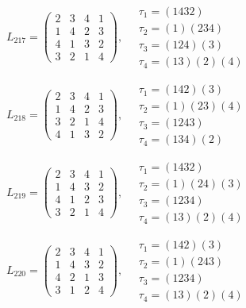 $L_{217} = \begin{pmatrix} 2 & 3 & 4 & 1 \\ 1 & 4 & 2 & 3 \\ 4 & 1 & 3 & 2 \\ 3 & 2 & 1 & 4 \end{pmatrix}, \quad \begin{matrix} \tau_{1} = (1 4 3 2) \\ \tau_{2} = (1)(2 3 4) \\ \tau_{3} = (1 2 4)(3) \\ \tau_{4} = (1 3)(2)(4) \end{matrix}$

$L_{218} = \begin{pmatrix} 2 & 3 & 4 & 1 \\ 1 & 4 & 2 & 3 \\ 3 & 2 & 1 & 4 \\ 4 & 1 & 3 & 2 \end{pmatrix}, \quad \begin{matrix} \tau_{1} = (1 4 2)(3) \\ \tau_{2} = (1)(2 3)(4) \\ \tau_{3} = (1 2 4 3) \\ \tau_{4} = (1 3 4)(2) \end{matrix}$

$L_{219} = \begin{pmatrix} 2 & 3 & 4 & 1 \\ 1 & 4 & 3 & 2 \\ 4 & 1 & 2 & 3 \\ 3 & 2 & 1 & 4 \end{pmatrix}, \quad \begin{matrix} \tau_{1} = (1 4 3 2) \\ \tau_{2} = (1)(2 4)(3) \\ \tau_{3} = (1 2 3 4) \\ \tau_{4} = (1 3)(2)(4) \end{matrix}$

$L_{220} = \begin{pmatrix} 2 & 3 & 4 & 1 \\ 1 & 4 & 3 & 2 \\ 4 & 2 & 1 & 3 \\ 3 & 1 & 2 & 4 \end{pmatrix}, \quad \begin{matrix} \tau_{1} = (1 4 2)(3) \\ \tau_{2} = (1)(2 4 3) \\ \tau_{3} = (1 2 3 4) \\ \tau_{4} = (1 3)(2)(4) \end{matrix}$

